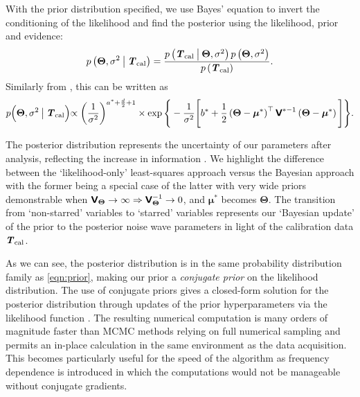 With the prior distribution specified, we use Bayes' equation to invert the conditioning of the likelihood and find the posterior using the likelihood, prior and evidence:
\begin{equation}
    p\left(\boldsymbol{\Theta}, \sigma^2 \given[\big] \y\right) = \frac{p\left(\y \given[\big]  \boldsymbol{\Theta}, \sigma^2\right)p\left(\boldsymbol{\Theta}, \sigma^2\right)}{p\left(\y\right)}.
\end{equation}
Similarly from \citet{banerjee}, this can be written as
\begin{equation}
    \label{eqn:post}
    p\Bigl(\boldsymbol{\Theta},\sigma^2 \given[\big] \y\Bigl) \propto \left(\frac{1}{\sigma^2}\right)^{a^* + \frac{d}{2} + 1} \times \exp{ \Bigg\{ -\frac{1}{\sigma^2} \Bigg[ b^* + \frac{1}{2}\left(\boldsymbol{\Theta} - \boldsymbol{\mu}^*\right)^{\top}\mathbfss{V}^{*-1}\left(\boldsymbol{\Theta} - \boldsymbol{\mu}^*\right) \Bigg] \Bigg\} }.
\end{equation}

The posterior distribution represents the uncertainty of our parameters after analysis, reflecting the increase in information \citep{nagel}. We highlight the difference between the `likelihood-only' least-squares approach versus the Bayesian approach with the former being a special case of the latter with very wide priors demonstrable when $\mathbfss{V}_{\boldsymbol{\Theta}} \rightarrow \infty \Rightarrow \mathbfss{V}_{\boldsymbol{\Theta}}^{-1} \rightarrow 0$, and $\boldsymbol{\mu}^*$ becomes $\boldsymbol{\Theta}$. The transition from `non-starred' variables to `starred' variables represents our `Bayesian update' of the prior to the posterior noise wave parameters in light of the calibration data $\y$.

As we can see, the posterior distribution is in the same probability distribution family as \cref{eqn:prior}, making our prior a \textit{conjugate prior} on the likelihood distribution. The use of conjugate priors gives a closed-form solution for the posterior distribution through updates of the prior hyperparameters via the likelihood function \citep{banerjee, orloff}. The resulting numerical computation is many orders of magnitude faster than MCMC methods relying on full numerical sampling and permits an in-place calculation in the same environment as the data acquisition. This becomes particularly useful for the speed of the algorithm as frequency dependence is introduced in which the computations would not be manageable without conjugate gradients. 

